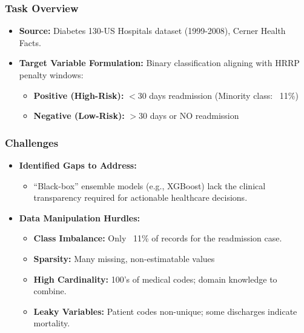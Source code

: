 \documentclass{beamer}
\begin{document}
\begin{frame}\frametitle{Task Overview}
\begin{itemize}
    \item \textbf{Source:} Diabetes 130-US Hospitals dataset (1999-2008), Cerner Health Facts.
    \vspace{4pt}
    \item \textbf{Target Variable Formulation:} Binary classification aligning with HRRP penalty windows:
    \begin{itemize}
      \item \textbf{Positive (High-Risk):} $<30$ days readmission (Minority class: ~11\%)
      \item \textbf{Negative (Low-Risk):} $>30$ days or NO readmission
    \end{itemize}
    \vspace{4pt}
\end{itemize}
\end{frame}

\begin{frame}\frametitle{Challenges}
\begin{itemize}
    \item \textbf{Identified Gaps to Address:}
    \begin{itemize}
        \item ``Black-box'' ensemble models (e.g., XGBoost) lack the clinical transparency required for actionable healthcare decisions.
    \end{itemize}
    \vspace{6pt}
    \item \textbf{Data Manipulation Hurdles:}
    \begin{itemize}
        \item \textbf{Class Imbalance:} Only ~11\% of records for the readmission case.
        \item \textbf{Sparsity:} Many missing, non-estimatable values
        \item \textbf{High Cardinality:} 100's of medical codes; domain knowledge to combine.
        \item \textbf{Leaky Variables:} Patient codes non-unique; some discharges indicate mortality.
    \end{itemize}
\end{itemize}
\end{frame}
\end{document}
